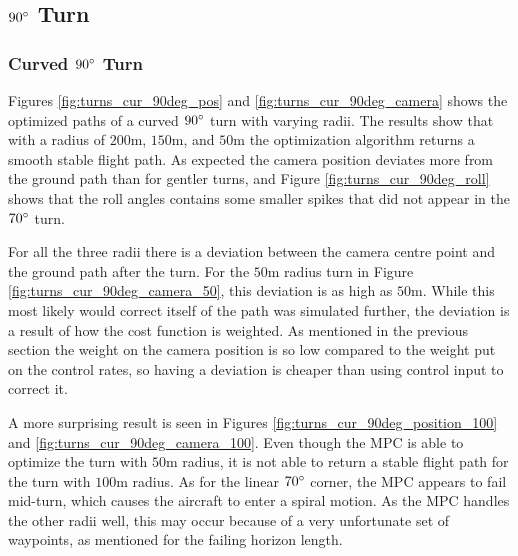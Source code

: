 \subsection{$90\degree$ Turn}

\subsubsection{Curved $90\degree$ Turn}

Figures \ref{fig:turns_cur_90deg_pos} and \ref{fig:turns_cur_90deg_camera} shows the optimized paths of a curved $90\degree$ turn with varying radii. The results show that with a radius of $200$m, $150$m, and $50$m the optimization algorithm returns a smooth stable flight path. As expected the camera position deviates more from the ground path than for gentler turns, and Figure \ref{fig:turns_cur_90deg_roll} shows that the roll angles contains some smaller spikes that did not appear in the $70\degree$ turn.

For all the three radii there is a deviation between the camera centre point and the ground path after the turn. For the $50$m radius turn in Figure \ref{fig:turns_cur_90deg_camera_50}, this deviation is as high as $50$m. While this most likely would correct itself of the path was simulated further, the deviation is a result of how the cost function is weighted. As mentioned in the previous section the weight on the camera position is so low compared to the weight put on the control rates, so having a deviation is cheaper than using control input to correct it.

A more surprising result is seen in Figures \ref{fig:turns_cur_90deg_position_100} and \ref{fig:turns_cur_90deg_camera_100}. Even though the MPC is able to optimize the turn with $50$m radius, it is not able to return a stable flight path for the turn with $100$m radius. As for the linear $70\degree$ corner, the MPC appears to fail mid-turn, which causes the aircraft to enter a spiral motion. As the MPC handles the other radii well, this may occur because of a very unfortunate set of waypoints, as mentioned for the failing horizon length.

